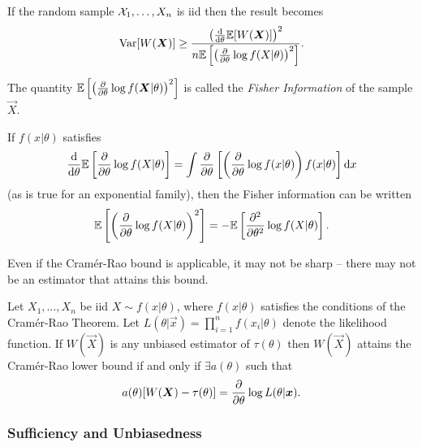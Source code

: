 \begin{corollary}
    If the random sample $\mathcal{X}_1, \dots, X_n$ is iid then the result becomes
    \[
        \text{Var}{}[W(\bm{X})] \geq \frac{\left(\frac{\text{d}{}}{\text{d}{} \theta} \mathbb{E}{}[W(\bm{X})] \right)^2}{n\mathbb{E}{}\left[ \left(\frac{\partial{}}{\partial{} \theta} \log f(X \vert{} \theta) \right)^2 \right]}.
    \]
\end{corollary}

\begin{definition}
    The quantity $\mathbb{E}{}\left[ \left(\frac{\partial{}}{\partial{} \theta} \log f(\bm{X} \vert{} \theta) \right)^2 \right]$ is called the \emph{Fisher Information} of the sample $\vec{X}$.
\end{definition}

\begin{lemma}
    If $f(x \vert{} \theta)$ satisfies
    \[
        \frac{\text{d}{}}{\text{d}{} \theta} \mathbb{E}{}\left[ \frac{\partial}{\partial \theta} \log f(X \vert{} \theta) \right] = \int \frac{\partial}{\partial \theta} \left[ \left( \frac{\partial}{\partial \theta} \log f(x \vert{} \theta) \right) f(x \vert{} \theta) \right] \text{d}{}x
    \]
    (as is true for an exponential family), then the Fisher information can be written
    \[
        \mathbb{E}{}\left[ \left(\frac{\partial{}}{\partial{} \theta} \log f(X \vert{} \theta) \right)^2 \right] = - \mathbb{E}{}\left[ \frac{\partial^2}{\partial \theta^2} \log f(X \vert{} \theta) \right].
    \]
\end{lemma}

\begin{remark}
    Even if the Cram\'{e}r-Rao bound is applicable, it may not be sharp -- there may not be an estimator that attains this bound.
\end{remark}

\begin{lemma}[Attainment]
    Let $X_1, \dots, X_n$ be iid $X \sim f(x \vert{} \theta)$, where $f(x \vert{} \theta)$ satisfies the conditions of the Cram\'{e}r-Rao Theorem. Let $L(\theta \vert{} \vec{x}) = \prod_{i=1}^n f(x_i \vert{} \theta)$ denote the likelihood function. If $W(\vec{X})$ is any unbiased estimator of $\tau(\theta)$ then $W(\vec{X})$ attains the Cram\'{e}r-Rao lower bound if and only if $\exists a(\theta)$ such that
    \[
        a(\theta) [W(\bm{X}) - \tau(\theta)] = \frac{\partial}{\partial \theta} \log L(\theta \vert{} \bm{x}).
    \]
\end{lemma}

\subsubsection{Sufficiency and Unbiasedness}

